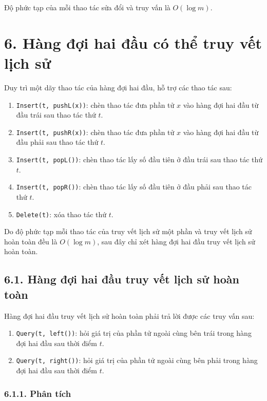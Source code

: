 \documentclass[11pt]{article}
\begin{document}
Độ phức tạp của mỗi thao tác sửa đổi và truy vấn là \(O(\log m)\).

\section*{6. Hàng đợi hai đầu có thể truy vết lịch sử}

Duy trì một dãy thao tác của hàng đợi hai đầu, hỗ trợ các thao tác sau:

\begin{enumerate}
  \item \texttt{Insert(t, pushL(x))}: chèn thao tác đưa phần tử \(x\) vào hàng
        đợi hai đầu từ đầu trái sau thao tác thứ \(t\).
  \item \texttt{Insert(t, pushR(x))}: chèn thao tác đưa phần tử \(x\) vào hàng
        đợi hai đầu từ đầu phải sau thao tác thứ \(t\).
  \item \texttt{Insert(t, popL())}: chèn thao tác lấy số đầu tiên ở đầu trái
        sau thao tác thứ \(t\).
  \item \texttt{Insert(t, popR())}: chèn thao tác lấy số đầu tiên ở đầu phải
        sau thao tác thứ \(t\).
  \item \texttt{Delete(t)}: xóa thao tác thứ \(t\).
\end{enumerate}

Do độ phức tạp mỗi thao tác của truy vết lịch sử một phần và truy vết lịch sử
hoàn toàn đều là \(O(\log m)\), sau đây chỉ xét hàng đợi hai đầu truy vết lịch
sử hoàn toàn.

\subsection*{6.1. Hàng đợi hai đầu truy vết lịch sử hoàn toàn}

Hàng đợi hai đầu truy vết lịch sử hoàn toàn phải trả lời được các truy vấn
sau:

\begin{enumerate}
  \item \texttt{Query(t, left())}: hỏi giá trị của phần tử ngoài cùng bên trái
        trong hàng đợi hai đầu sau thời điểm \(t\).
  \item \texttt{Query(t, right())}: hỏi giá trị của phần tử ngoài cùng bên
        phải trong hàng đợi hai đầu sau thời điểm \(t\).
\end{enumerate}

\subsubsection*{6.1.1. Phân tích}
\end{document}
